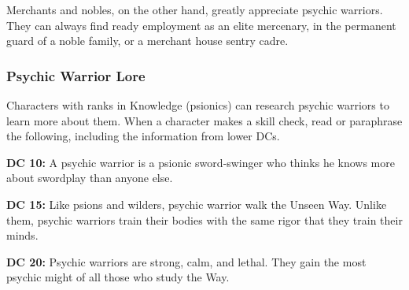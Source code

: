 Merchants and nobles, on the other hand, greatly appreciate psychic warriors. They can always find ready employment as an elite mercenary, in the permanent guard of a noble family, or a merchant house sentry cadre.

\subsubsection{Psychic Warrior Lore}

Characters with ranks in Knowledge (psionics) can research psychic warriors to learn more about them. When a character makes a skill check, read or paraphrase the following, including the information from lower DCs.

\textbf{DC 10:} A psychic warrior is a psionic sword‐swinger who thinks he knows more about swordplay than anyone else.

\textbf{DC 15:} Like psions and wilders, psychic warrior walk the Unseen Way. Unlike them, psychic warriors train their bodies with the same rigor that they train their minds.

\textbf{DC 20:} Psychic warriors are strong, calm, and lethal. They gain the most psychic might of all those who study the Way.
